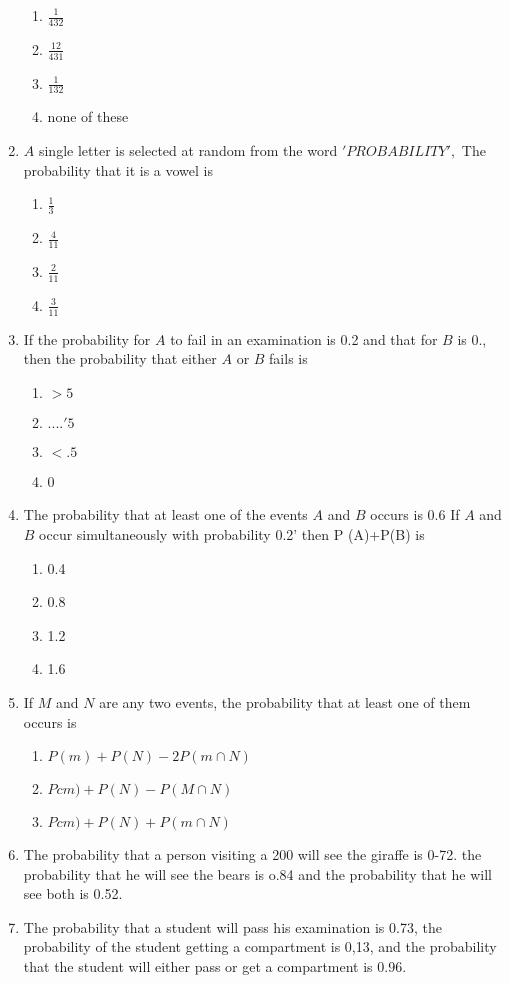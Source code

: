 \documentclass[12pt]{article}
\begin{document}
\begin{enumerate}
	\begin{enumerate}
\item $\frac{1}{432}$
\item $\frac{12}{431}$
\item $\frac{1}{132}$
\item none of these
	\end{enumerate}
\item $A$ single letter is selected at random from the word $'PROBABILITY',$ The probability that it is a vowel is
	\begin{enumerate}
\item $\frac{1}{3}$
\item $\frac{4}{11}$
\item $\frac{2}{11}$
\item $\frac{3}{11}$
	\end{enumerate}
\item If the probability for $A$ to fail in an examination is 0.2 and that for $B$ is 0., then the probability that either $A$ or $B$ fails is
	\begin{enumerate}
\item $>5$ 
\item $....\prime 5$
\item $<.5$
\item 0
	\end{enumerate}
\item The probability that at least one of the events $A$ and $B$ occurs is 0.6 If $A$ and $B$ occur simultaneously with probability 0.2' then P  (A)+P(B) is
	\begin{enumerate}
\item 0.4
\item 0.8
\item 1.2
\item 1.6
	\end{enumerate}
\item If $M$ and $N$ are any two events, the probability that at least one of them occurs is
	\begin{enumerate}
\item $P(m)+P(N)-2 P (m\cap N)$
\item $Pcm)+P(N)-P(M\cap N)$
\item $Pcm)+P(N)+P(m\cap N)$
	\end{enumerate}
\item The probability that a person visiting a 200 will see the giraffe is 0-72. the probability that he will see the bears is o.84 and the probability that he will see both is 0.52.
\item The probability that a student will pass his examination is 0.73, the probability of the student getting a compartment is 0,13, and the probability that the student will either pass or get a compartment is 0.96.

\end{enumerate}
\end{document}
